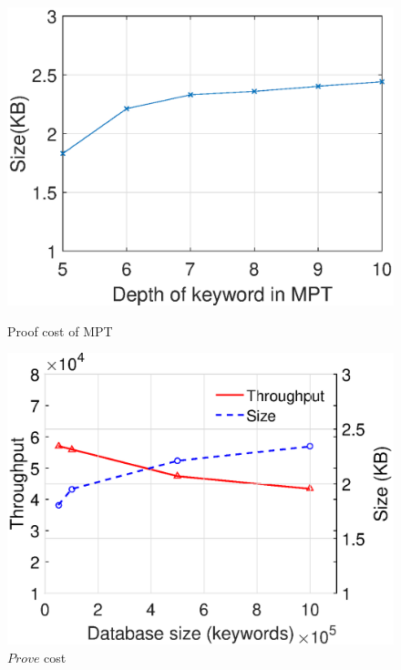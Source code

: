 \begin{figure}[bhpt]
  \hspace{-40.0pt}
  \par \vspace{-10.pt}
  \hspace{-36.0pt}

  \begin{minipage}[b]{0.48 \textwidth}
    \includegraphics[width=\textwidth]{expr/proof}
    \caption{Proof cost of MPT}
    \label{fig:proof}
  \end{minipage}
  \begin{minipage}[b]{0.48 \textwidth}
    \includegraphics[width=\textwidth]{expr/prove}
    \caption{$Prove$ cost}
    \label{fig:prove}
  \end{minipage}


\end{figure}
